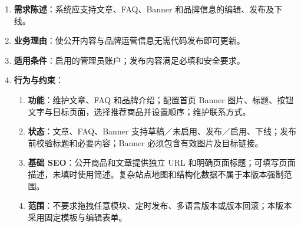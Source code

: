\begin{enumerate}
\item {\bfseries 需求陈述}：系统应支持文章、FAQ、Banner 和品牌信息的编辑、发布及下线。
\item {\bfseries 业务理由}：使公开内容与品牌运营信息无需代码发布即可更新。
\item {\bfseries 适用条件}：启用的管理员账户；发布内容满足必填和安全要求。
\item {\bfseries 行为与约束}：
\begin{enumerate}
\item {\bfseries 功能}：维护文章、FAQ 和品牌介绍；配置首页 Banner 图片、标题、按钮文字与目标页面，选择推荐商品并设置顺序；维护联系方式。
\item {\bfseries 状态}：文章、FAQ、Banner 支持草稿／未启用、发布／启用、下线；发布前校验标题和必要内容；Banner 必须包含有效图片及目标链接。
\item {\bfseries 基础 SEO}：公开商品和文章提供独立 URL 和明确页面标题；可填写页面描述，未填时使用简述。复杂站点地图和结构化数据不属于本版本强制范围。
\item {\bfseries 范围}：不要求拖拽任意模块、定时发布、多语言版本或版本回滚；本版本采用固定模板与编辑表单。
\end{enumerate}

\end{enumerate}


